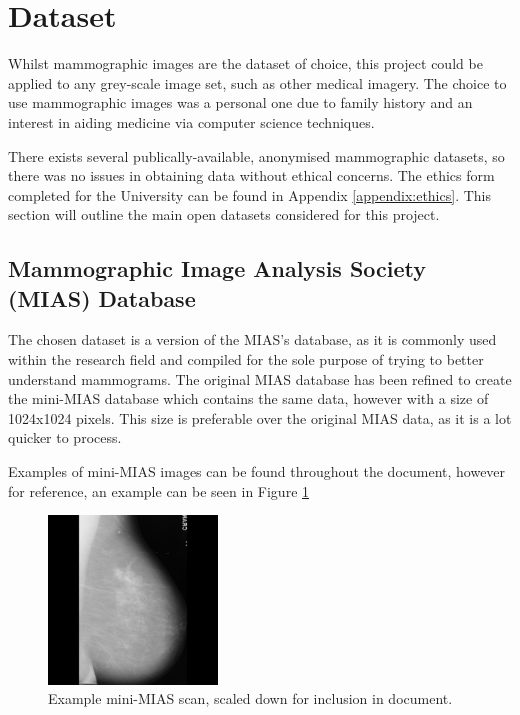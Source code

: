 \section{Dataset}

Whilst \gls{mammographic images} are the dataset of choice, this project could be applied to any grey-scale image set, such as other medical imagery. The choice to use \gls{mammographic images} was a personal one due to family history and an interest in aiding medicine via computer science techniques.

There exists several publically-available, anonymised mammographic datasets, so there was no issues in obtaining data without ethical concerns. The ethics form completed for the University can be found in Appendix \ref{appendix:ethics}. This section will outline the main open datasets considered for this project.

\subsection{Mammographic Image Analysis Society (MIAS) Database}

The chosen dataset is a version of the \acrfull{MIAS}'s database, as it is commonly used within the research field and compiled for the sole purpose of trying to better understand mammograms. The original \acrshort{MIAS} database has been refined to create the mini-\acrshort{MIAS} database which contains the same data, however with a size of 1024x1024 pixels. This size is preferable over the original \acrshort{MIAS} data, as it is a lot quicker to process.

Examples of mini-\acrshort{MIAS} images can be found throughout the document, however for reference, an example can be seen in Figure \ref{fig:mini-mias}

\begin{figure}[H]
  \centering
  \includegraphics[width=0.4\textwidth]{Chapter2/tools/mias.jpg}
  \caption{Example mini-MIAS scan, scaled down for inclusion in document.}
  \label{fig:mini-mias}
\end{figure}

